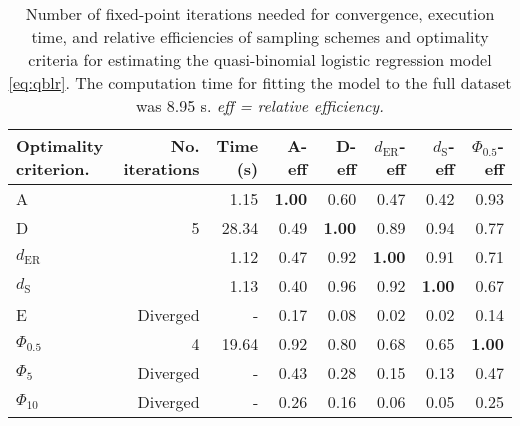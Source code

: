 \begin{table}[htb!]
\centering
\caption{Number of fixed-point iterations needed for convergence, execution time, and relative efficiencies of sampling schemes and optimality criteria for estimating the quasi-binomial logistic regression model \eqref{eq:qblr}. The computation time for fitting the model to the full dataset was 8.95 s. \textit{eff = relative efficiency.}} 
\label{tab:impact_speed_response_surface}
\begin{tabular}{lrrrrrrr}
 Optimality criterion. & No. iterations & Time (s) & A-eff & D-eff & $d_{\mathrm{ER}}$-eff & $d_{\mathrm{S}}$-eff & $\Phi_{0.5}$-eff \\ 
  \hline
A &  & 1.15 & \textbf{1.00} & 0.60 & 0.47 & 0.42 & 0.93 \\ 
  D & 5 & 28.34 & 0.49 & \textbf{1.00} & 0.89 & 0.94 & 0.77 \\ 
  $d_{\mathrm{ER}}$ &  & 1.12 & 0.47 & 0.92 & \textbf{1.00} & 0.91 & 0.71 \\ 
  $d_{\mathrm{S}}$ &  & 1.13 & 0.40 & 0.96 & 0.92 & \textbf{1.00} & 0.67 \\ 
  E & Diverged & - & 0.17 & 0.08 & 0.02 & 0.02 & 0.14 \\ 
  $\Phi_{0.5}$ & 4 & 19.64 & 0.92 & 0.80 & 0.68 & 0.65 & \textbf{1.00} \\ 
  $\Phi_5$ & Diverged & - & 0.43 & 0.28 & 0.15 & 0.13 & 0.47 \\ 
  $\Phi_{10}$ & Diverged & - & 0.26 & 0.16 & 0.06 & 0.05 & 0.25 \\ 
   \hline
\end{tabular}
\end{table}
